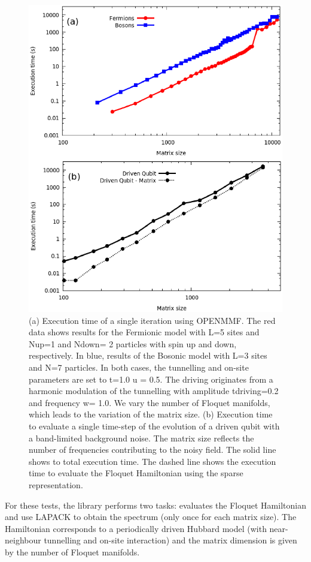 \documentclass[10pt,a4paper]{article}
\begin{document}
\begin{figure}
\centering
\includegraphics[width=12cm]{openmmf_timing.ps}
\caption{\label{fig:performance} (a) Execution time of a single iteration using OPENMMF. The red data shows results for the Fermionic model with L=5 sites and Nup=1 and Ndown= 2 particles with spin up and down, respectively. In blue, results of the Bosonic model with L=3 sites and N=7 particles. In both cases, the tunnelling and on-site parameters are set to t=1.0 u = 0.5. The driving originates from a harmonic modulation of the tunnelling with amplitude tdriving=0.2 and frequency w= 1.0. We vary the number of Floquet manifolds, which leads to the variation of the matrix size. (b) Execution time to evaluate a single time-step of the evolution of a driven qubit with a band-limited background noise.  The matrix size reflects the number of frequencies contributing to the noisy field. The solid line shows to total execution time. The dashed line shows the execution time to evaluate the Floquet Hamiltonian using the sparse representation. }
\end{figure}

For these tests, the library performs two tasks: evaluates the Floquet Hamiltonian and use LAPACK to obtain the spectrum (only once for each matrix size). The Hamiltonian corresponds to a periodically driven Hubbard model (with near-neighbour tunnelling and on-site interaction) and the matrix dimension is given by the number of Floquet manifolds.
\end{document}
